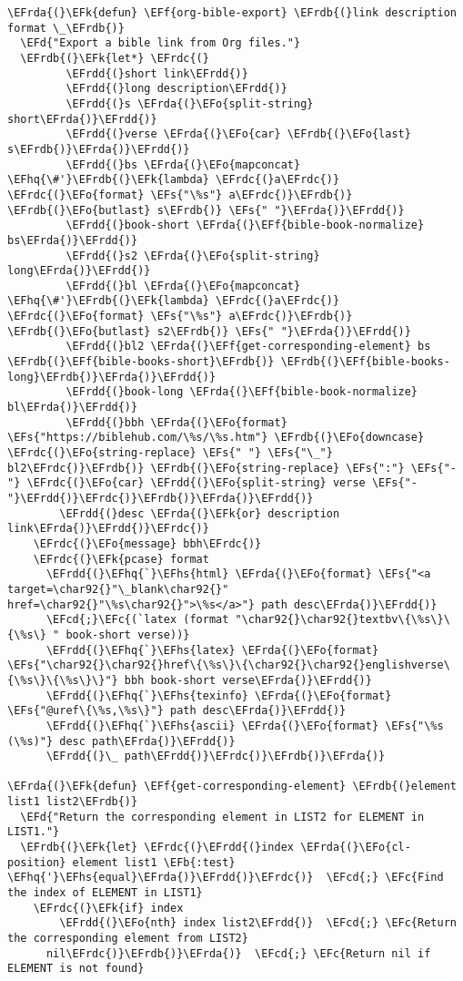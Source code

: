 \documentclass[a4wide,10pt]{article}
\newcommand{\EFc}[1]{\textcolor{EFc}{#1}} %
\newcommand{\EFcd}[1]{\textcolor{EFcd}{#1}} %
\newcommand{\EFs}[1]{\textcolor{EFs}{#1}} %
\newcommand{\EFd}[1]{\textcolor{EFd}{#1}} %
\newcommand{\EFk}[1]{\textcolor{EFk}{#1}} %
\newcommand{\EFb}[1]{\textcolor{EFb}{#1}} %
\newcommand{\EFf}[1]{\textcolor{EFf}{#1}} %
\newcommand{\EFo}[1]{\textcolor{EFo}{#1}} %
\newcommand{\EFhq}[1]{\textcolor{EFhq}{#1}} %
\newcommand{\EFhs}[1]{\textcolor{EFhs}{#1}} %
\newcommand{\EFrda}[1]{\textcolor{EFrda}{#1}} %
\newcommand{\EFrdb}[1]{\textcolor{EFrdb}{#1}} %
\newcommand{\EFrdc}[1]{\textcolor{EFrdc}{#1}} %
\newcommand{\EFrdd}[1]{\textcolor{EFrdd}{#1}} %
\begin{document}
\begin{Code}
\begin{Verbatim}
\EFrda{(}\EFk{defun} \EFf{org-bible-export} \EFrdb{(}link description format \_\EFrdb{)}
  \EFd{"Export a bible link from Org files."}
  \EFrdb{(}\EFk{let*} \EFrdc{(}
         \EFrdd{(}short link\EFrdd{)}
         \EFrdd{(}long description\EFrdd{)}
         \EFrdd{(}s \EFrda{(}\EFo{split-string} short\EFrda{)}\EFrdd{)}
         \EFrdd{(}verse \EFrda{(}\EFo{car} \EFrdb{(}\EFo{last} s\EFrdb{)}\EFrda{)}\EFrdd{)}
         \EFrdd{(}bs \EFrda{(}\EFo{mapconcat} \EFhq{\#'}\EFrdb{(}\EFk{lambda} \EFrdc{(}a\EFrdc{)} \EFrdc{(}\EFo{format} \EFs{"\%s"} a\EFrdc{)}\EFrdb{)} \EFrdb{(}\EFo{butlast} s\EFrdb{)} \EFs{" "}\EFrda{)}\EFrdd{)}
         \EFrdd{(}book-short \EFrda{(}\EFf{bible-book-normalize} bs\EFrda{)}\EFrdd{)}
         \EFrdd{(}s2 \EFrda{(}\EFo{split-string} long\EFrda{)}\EFrdd{)}
         \EFrdd{(}bl \EFrda{(}\EFo{mapconcat} \EFhq{\#'}\EFrdb{(}\EFk{lambda} \EFrdc{(}a\EFrdc{)} \EFrdc{(}\EFo{format} \EFs{"\%s"} a\EFrdc{)}\EFrdb{)} \EFrdb{(}\EFo{butlast} s2\EFrdb{)} \EFs{" "}\EFrda{)}\EFrdd{)}
         \EFrdd{(}bl2 \EFrda{(}\EFf{get-corresponding-element} bs \EFrdb{(}\EFf{bible-books-short}\EFrdb{)} \EFrdb{(}\EFf{bible-books-long}\EFrdb{)}\EFrda{)}\EFrdd{)}
         \EFrdd{(}book-long \EFrda{(}\EFf{bible-book-normalize} bl\EFrda{)}\EFrdd{)}
         \EFrdd{(}bbh \EFrda{(}\EFo{format} \EFs{"https://biblehub.com/\%s/\%s.htm"} \EFrdb{(}\EFo{downcase} \EFrdc{(}\EFo{string-replace} \EFs{" "} \EFs{"\_"} bl2\EFrdc{)}\EFrdb{)} \EFrdb{(}\EFo{string-replace} \EFs{":"} \EFs{"-"} \EFrdc{(}\EFo{car} \EFrdd{(}\EFo{split-string} verse \EFs{"-"}\EFrdd{)}\EFrdc{)}\EFrdb{)}\EFrda{)}\EFrdd{)}
        \EFrdd{(}desc \EFrda{(}\EFk{or} description link\EFrda{)}\EFrdd{)}\EFrdc{)}
    \EFrdc{(}\EFo{message} bbh\EFrdc{)}
    \EFrdc{(}\EFk{pcase} format
      \EFrdd{(}\EFhq{`}\EFhs{html} \EFrda{(}\EFo{format} \EFs{"<a target=\char92{}"\_blank\char92{}" href=\char92{}"\%s\char92{}">\%s</a>"} path desc\EFrda{)}\EFrdd{)}
      \EFcd{;}\EFc{(`latex (format "\char92{}\char92{}textbv\{\%s\}\{\%s\} " book-short verse))}
      \EFrdd{(}\EFhq{`}\EFhs{latex} \EFrda{(}\EFo{format} \EFs{"\char92{}\char92{}href\{\%s\}\{\char92{}\char92{}englishverse\{\%s\}\{\%s\}\}"} bbh book-short verse\EFrda{)}\EFrdd{)}
      \EFrdd{(}\EFhq{`}\EFhs{texinfo} \EFrda{(}\EFo{format} \EFs{"@uref\{\%s,\%s\}"} path desc\EFrda{)}\EFrdd{)}
      \EFrdd{(}\EFhq{`}\EFhs{ascii} \EFrda{(}\EFo{format} \EFs{"\%s (\%s)"} desc path\EFrda{)}\EFrdd{)}
      \EFrdd{(}\_ path\EFrdd{)}\EFrdc{)}\EFrdb{)}\EFrda{)}

\EFrda{(}\EFk{defun} \EFf{get-corresponding-element} \EFrdb{(}element list1 list2\EFrdb{)}
  \EFd{"Return the corresponding element in LIST2 for ELEMENT in LIST1."}
  \EFrdb{(}\EFk{let} \EFrdc{(}\EFrdd{(}index \EFrda{(}\EFo{cl-position} element list1 \EFb{:test} \EFhq{'}\EFhs{equal}\EFrda{)}\EFrdd{)}\EFrdc{)}  \EFcd{;} \EFc{Find the index of ELEMENT in LIST1}
    \EFrdc{(}\EFk{if} index
        \EFrdd{(}\EFo{nth} index list2\EFrdd{)}  \EFcd{;} \EFc{Return the corresponding element from LIST2}
      nil\EFrdc{)}\EFrdb{)}\EFrda{)}  \EFcd{;} \EFc{Return nil if ELEMENT is not found}




\end{Verbatim}
\end{Code}
\end{document}
